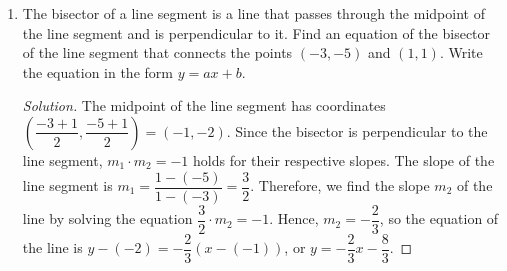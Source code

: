 \documentclass[12pt]{article}
\newenvironment{solution}{\begin{proof}[Solution]}{\end{proof}}
\begin{document}
\begin{enumerate}
\begin{enumerate}
\begin{solution}
				The slope of this line is $m=\dfrac{-2-(-1)}{3-1}=-\dfrac{1}{2}$. Hence, $-\dfrac{1}{2}=\dfrac{2}{k}$ and $k=-4$.
			\end{solution}
			\item is perpendicular to the line $y=2$.
			\begin{solution}
				Since this line has slope $0$, we cannot use the equation from part (e). However, lines with slope $0$ are horizontal, so any line perpendicular to it has to be vertical. Thus, we need to find a $k$ for which $2x-ky=1$ is vertical. This happens when $k=0$.
			\end{solution}
			\item whose nonzero coordinates of the $x$- and $y$-intercepts are equal.
			\begin{solution}
				The $x$-intercept is obtained by setting $y=0$. Hence, $2x=1$ and $x=\dfrac{1}{2}$. The $y$-intercept is obtained by setting $x=0$. Hence, $-ky=1$ and $y=-\dfrac{1}{k}$, provided $k\neq 0$ (note that when $k=0$, the line is horizontal so it has no $y$-intercept). 
				
				Since the intercepts are equal, we set $\dfrac{1}{2}=-\dfrac{1}{k}$, so $k=-2$.
			\end{solution}
	\end{enumerate}
			\item The bisector of a line segment is a line that passes through the midpoint of the line segment and is perpendicular to it. Find an equation of the bisector of the line segment that connects the points $(-3,-5)$ and $(1,1)$. Write the equation in the form $y=ax+b$.
			\begin{solution}
				The midpoint of the line segment has coordinates $\left(\dfrac{-3+1}{2},\dfrac{-5+1}{2}\right)=(-1,-2)$. Since the bisector is perpendicular to the line segment, $m_1\cdot m_2=-1$ holds for their respective slopes. The slope of the line segment is $m_1=\dfrac{1-(-5)}{1-(-3)}=\dfrac{3}{2}$. Therefore, we find the slope $m_2$ of the line by solving the equation $\dfrac{3}{2}\cdot m_2=-1$. Hence, $m_2=-\dfrac{2}{3}$, so the equation of the line is $y-(-2)=-\dfrac{2}{3}(x-(-1))$, or $y=-\dfrac{2}{3}x-\dfrac{8}{3}$.
			\end{solution}
	

\end{enumerate}
\end{document}

